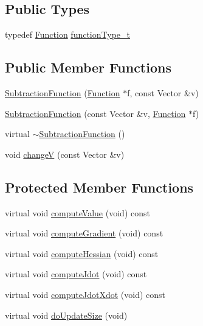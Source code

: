 \subsection*{Public Types}
\begin{DoxyCompactItemize}
\item 
typedef \hyperlink{classocra_1_1Function}{Function} \hyperlink{classocra_1_1SubtractionFunction_a371966d5def8140a019099fc4346f413}{function\+Type\+\_\+t}
\end{DoxyCompactItemize}
\subsection*{Public Member Functions}
\begin{DoxyCompactItemize}
\item 
\hyperlink{classocra_1_1SubtractionFunction_a65b777d9cbd05c1e14063fd0bb99f262}{Subtraction\+Function} (\hyperlink{classocra_1_1Function}{Function} $\ast$f, const Vector \&v)
\item 
\hyperlink{classocra_1_1SubtractionFunction_ab825dea759ffedcdd1c30b19e1df02f1}{Subtraction\+Function} (const Vector \&v, \hyperlink{classocra_1_1Function}{Function} $\ast$f)
\item 
virtual \hyperlink{classocra_1_1SubtractionFunction_a87e030eb99b05722464881e3bb220027}{$\sim$\+Subtraction\+Function} ()
\item 
void \hyperlink{classocra_1_1SubtractionFunction_a00ed4b4afd66bd91dea2f2ebbcd5b615}{changeV} (const Vector \&v)
\end{DoxyCompactItemize}
\subsection*{Protected Member Functions}
\begin{DoxyCompactItemize}
\item 
virtual void \hyperlink{classocra_1_1SubtractionFunction_a4cdbb66a83d1113ecea252898ec1bda3}{compute\+Value} (void) const
\item 
virtual void \hyperlink{classocra_1_1SubtractionFunction_a117739796f68e8cf8e8931606ff09443}{compute\+Gradient} (void) const
\item 
virtual void \hyperlink{classocra_1_1SubtractionFunction_ac6558a3de7573facbc7a4d1b03128e43}{compute\+Hessian} (void) const
\item 
virtual void \hyperlink{classocra_1_1SubtractionFunction_a2bbae38f5ddcfacb9bc5f4114ffb7b02}{compute\+Jdot} (void) const
\item 
virtual void \hyperlink{classocra_1_1SubtractionFunction_aeca1fe085ed1302c87e7ed4ee80082ed}{compute\+Jdot\+Xdot} (void) const
\item 
virtual void \hyperlink{classocra_1_1SubtractionFunction_abeccbd4ec6cabf7bf18169e052a993d5}{do\+Update\+Size} (void)
\end{DoxyCompactItemize}
